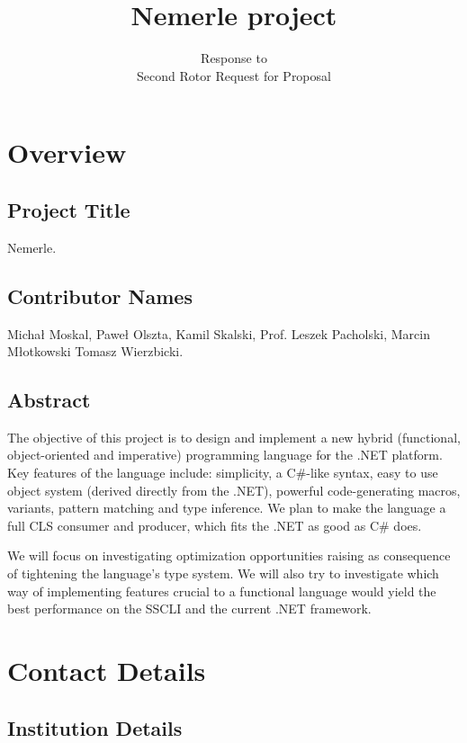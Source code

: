 \documentclass[a4paper,11pt]{article}
\title{Nemerle project}
\author{Response to\\Second Rotor Request for Proposal}
\date{}
\begin{document}
\maketitle
\thispagestyle{empty}

\section{Overview}

\subsection{Project Title}

Nemerle.

\subsection{Contributor Names}
Micha{\l} Moskal, Pawe{\l} Olszta, Kamil Skalski, Prof. Leszek Pacholski, Marcin M{\l}otkowski
Tomasz Wierzbicki.

\subsection{Abstract}

The objective of this project is to design and implement a new 
hybrid (functional, object-oriented and imperative) programming 
language for the .NET platform. Key features of the language 
include: simplicity, a C\#-like syntax, easy to use object 
system (derived directly from the .NET), powerful code-generating 
macros, variants, pattern matching and type inference. We plan 
to make the language a full CLS consumer and producer, which 
fits the .NET as good as C\# does.

We will focus on investigating optimization opportunities 
raising as consequence of tightening the language's type system.
We will also try to investigate which way of implementing features
crucial to a functional language would yield the best performance 
on the SSCLI and the current .NET framework.


\section{Contact Details}


\subsection{Institution Details}
\end{document}
